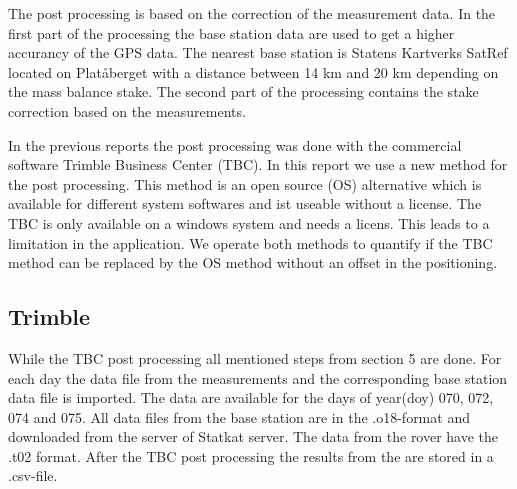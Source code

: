 
The post processing is based on the correction of the measurement data.
In the first part of the processing the base station data are used to get a higher accurancy of the GPS data.
The nearest base station is Statens Kartverks SatRef located on Platåberget with a distance between 14 km and 20 km depending on the mass balance stake.
The second part of the processing contains the stake correction based on the measurements.
\medskip

In the previous reports the post processing was done with the commercial software Trimble Business Center (TBC). 
In this report we use a new method for the post processing. 
This method is an open source (OS) alternative which is available for different system softwares and ist useable without a license. 
The TBC is only available on a windows system and needs a licens.
This leads to a limitation in the application. 
We operate both methods to quantify if the TBC method can be replaced by the OS method without an offset in the positioning.

\subsection{Trimble}

While the TBC post processing all mentioned steps from section 5 \cite{Trquickstart} are done.
For each day the data file from the measurements and the corresponding base station data file is imported. 
The data are available for the days of year(doy) 070, 072, 074 and 075.
All data files from the base station are in the .o18-format and downloaded from the server of Statkat server.
The data from the rover have the .t02 format. 
After the TBC post processing the results from the are stored in a .csv-file.
\medskip

